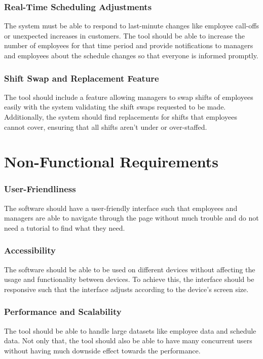 \documentclass[a4paper,12pt, oneside]{report}
\begin{document}
\subsubsection{Real-Time Scheduling Adjustments}
The system must be able to respond to last-minute changes like employee call-offs or unexpected increases in customers. The tool should be able to increase the number of employees for that time period and provide notifications to managers and employees about the schedule changes so that everyone is informed promptly.\\

\subsubsection{Shift Swap and Replacement Feature}
The tool should include a feature allowing managers to swap shifts of employees easily with the system validating the shift swaps requested to be made. Additionally, the system should find replacements for shifts that employees cannot cover, ensuring that all shifts aren't under or over-staffed.\\

\section{Non-Functional Requirements}

\subsubsection{User-Friendliness}
The software should have a user-friendly interface such that employees and managers are able to navigate through the page without much trouble and do not need a tutorial to find what they need.\\

\subsubsection{Accessibility}
The software should be able to be used on different devices without affecting the usage and functionality between devices. To achieve this, the interface should be responsive such that the interface adjusts according to the device's screen size.\\

\subsubsection{Performance and Scalability}
The tool should be able to handle large datasets like employee data and schedule data. Not only that, the tool should also be able to have many concurrent users without having much downside effect towards the performance. \\
\end{document}
